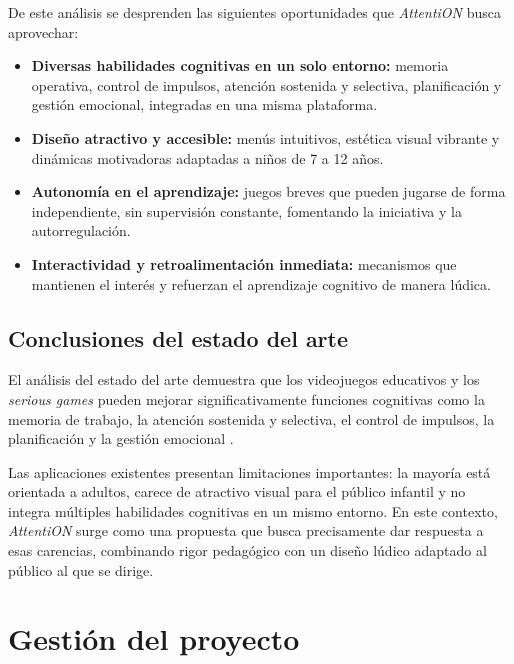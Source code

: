 \documentclass[12pt, a4paper]{report}
\begin{document}
De este análisis se desprenden las siguientes oportunidades que
\textit{AttentiON} busca aprovechar:

\begin{itemize}
  \item \textbf{Diversas habilidades cognitivas en un solo entorno:}
    memoria operativa, control de impulsos, atención sostenida y selectiva,
    planificación y gestión emocional, integradas en una misma plataforma.
  \item \textbf{Diseño atractivo y accesible:} menús intuitivos, estética
    visual vibrante y dinámicas motivadoras adaptadas a niños de 7 a 12 años.
  \item \textbf{Autonomía en el aprendizaje:} juegos breves que pueden jugarse
    de forma independiente, sin supervisión constante, fomentando la iniciativa
    y la autorregulación.
  \item \textbf{Interactividad y retroalimentación inmediata:} mecanismos
    que mantienen el interés y refuerzan el aprendizaje cognitivo de manera
    lúdica.
\end{itemize}

\section{Conclusiones del estado del arte}

El análisis del estado del arte demuestra que los videojuegos educativos y los
\textit{serious games} pueden mejorar significativamente funciones cognitivas
como la memoria de trabajo, la atención sostenida y selectiva, el control de
impulsos, la planificación y la gestión emocional
\citep{Anguera2013,Connolly2012,Granic2014}.

Las aplicaciones existentes presentan limitaciones importantes: la mayoría está
orientada a adultos, carece de atractivo visual para el público infantil y no
integra múltiples habilidades cognitivas en un mismo entorno. En este contexto,
\textit{AttentiON} surge como una propuesta que busca precisamente dar respuesta
a esas carencias, combinando rigor pedagógico con un diseño lúdico adaptado al
público al que se dirige.

\chapter{Gestión del proyecto}
\end{document}
